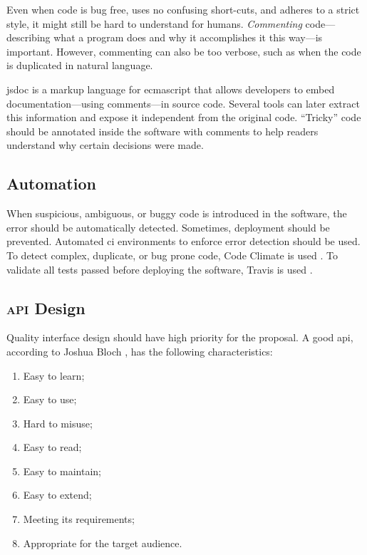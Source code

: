 Even when code is bug free, uses no confusing short-cuts, and adheres to a
  strict style, it might still be hard to understand for humans.
\emph{Commenting} code---describing what a program does and why it
  accomplishes it this way---is important.
However, commenting can also be too verbose, such as when the code is
  duplicated in natural language.

\gls{jsdoc} \autocite{google.com-clojure-compiler-jsdoc} is a markup language
  for \gls{ecmascript} that allows developers to embed documentation---using
  comments---in source code.
Several tools can later extract this information and expose it independent
  from the original code.
``Tricky'' code should be annotated inside the software with comments to help
  readers understand why certain decisions were made.

\subsection{Automation}\label{automation}

When suspicious, ambiguous, or buggy code is introduced in the software, the
  error should be automatically detected.
Sometimes, deployment should be prevented.
Automated \gls{ci} environments to enforce error detection should be used.
To detect complex, duplicate, or bug prone code, Code Climate is used
  \autocite{codeclimate.com}.
To validate all tests passed before deploying the software, Travis is used
  \autocite{travis-ci.org}.

\subsection{\textsc{api} Design}\label{design-1}

Quality interface design should have high priority for the proposal.
A good \gls{api}, according to Joshua Bloch
  \autocite*{bloch-joshua-how-design-good-api-why-matters}, has the following
  characteristics:

\begin{enumerate}
\item Easy to learn;
\item Easy to use;
\item Hard to misuse;
\item Easy to read;
\item Easy to maintain;
\item Easy to extend;
\item Meeting its requirements;
\item Appropriate for the target audience.
\end{enumerate}

